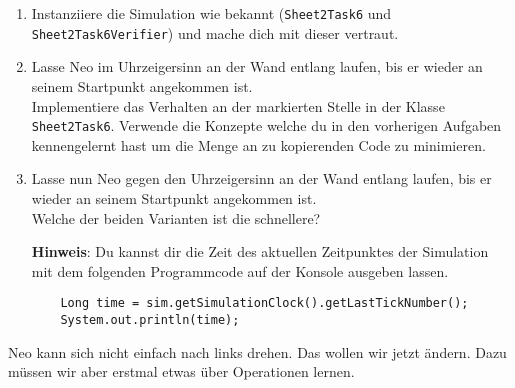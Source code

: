 

\begin{enumerate}
    \item Instanziiere die Simulation wie bekannt (\lstinline{Sheet2Task6} und \lstinline{Sheet2Task6Verifier}) und mache dich mit dieser vertraut.
    \item Lasse Neo im Uhrzeigersinn an der Wand entlang laufen, bis er wieder an seinem Startpunkt angekommen ist.\\
        Implementiere das Verhalten an der markierten Stelle in der Klasse \lstinline{Sheet2Task6}. Verwende die Konzepte welche du in den vorherigen Aufgaben kennengelernt hast um die Menge an zu kopierenden Code zu minimieren.
    \item Lasse nun Neo gegen den Uhrzeigersinn an der Wand entlang laufen, bis er wieder an seinem Startpunkt angekommen ist.\\
        Welche der beiden Varianten ist die schnellere?

    \textbf{Hinweis}: Du kannst dir die Zeit des aktuellen Zeitpunktes der Simulation mit dem folgenden Programmcode auf der Konsole ausgeben lassen.

        \begin{lstlisting}
    Long time = sim.getSimulationClock().getLastTickNumber();
    System.out.println(time);
        \end{lstlisting}

        
\end{enumerate}

        Neo kann sich nicht einfach nach links drehen.
        Das wollen wir jetzt ändern.
        Dazu müssen wir aber erstmal etwas über Operationen lernen.


